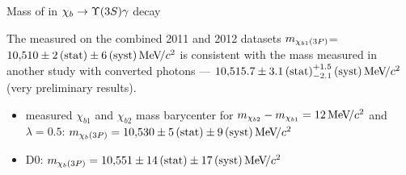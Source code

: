 \begin{frame}{Mass of \chiboneThreeP in $\chib \to \Y3S \gamma$ decay}
\setlength{\unitlength}{1mm}

\begin{center}
\end{center}


The measured on the combined 2011 and 2012 datasets
$m_{\chi_{b 1}(3P)}$=\textcolor{red}{$10{,}510\pm2\mathrm{\,(stat)}\pm6\mathrm{\,(syst)}{\mathrm{\,Me\kern -0.1em V\!/}c^2}$} is
consistent with the mass measured in another study with converted photons ---
\textcolor{blue}{$10{,}515.7\pm3.1\mathrm{\,(stat)}^{+1.5}_{-2.1}\mathrm{\,(syst)}{\mathrm{\,Me\kern -0.1em V\!/}c^2}$} (very
preliminary results).

\begin{itemize}
\item \atlas measured $\chi_{b1}$ and $\chi_{b2}$  mass barycenter for $m_{\chi_{b2}} - m_{\chi_{b1}}=12{\mathrm{\,Me\kern -0.1em V\!/}c^2}$ and $\lambda=0.5$:
\textcolor{blue}{$m_{\chi_{b}(3P)} = 10{,}530\pm5\mathrm{\,(stat)}\pm9\mathrm{\,(syst)}{\mathrm{\,Me\kern -0.1em V\!/}c^2}$}
\item D0: \textcolor{blue}{$m_{\chi_{b}(3P)} = 10{,}551\pm14\mathrm{\,(stat)}\pm17\mathrm{\,(syst)}{\mathrm{\,Me\kern -0.1em V\!/}c^2}$}
\end{itemize}
\end{frame}
